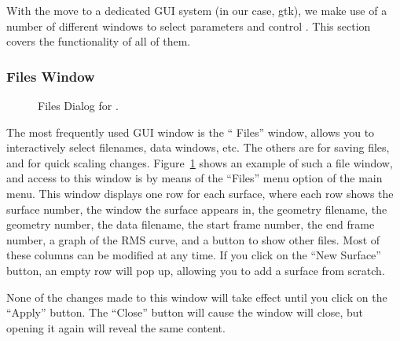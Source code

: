 With the move to a dedicated GUI system (in our case, gtk), we make use of
a number of different windows to select parameters and control \map{}.
This section covers the functionality of all of them.

\subsubsection{Files Window}
\label{sec:fileswindow}

\begin{figure}[htb]
  \begin{makeimage}
  \end{makeimage}
  \filesdialogone
  \caption{\label{fig:file1} Files Dialog for \map{}.}
\end{figure}

The most frequently used GUI window is the ``\map{} Files'' window, allows
you to interactively select filenames, data windows, etc.  The others are
for saving files, and for quick scaling changes.  Figure~\ref{fig:file1}
shows an example of such a file window, and access to this window is by
means of the ``Files'' menu option of the main menu.  This window displays
one row for each surface, where each row shows the surface number, the
window the surface appears in, the geometry filename, the geometry number,
the data filename, the start frame number, the end frame number, a graph of
the RMS curve, and a button to show other files.  Most of these columns can
be modified at any time.  If you click on the ``New Surface'' button, an
empty row will pop up, allowing you to add a surface from scratch.
 
None of the changes made to this window will take effect until you click on
the ``Apply'' button.  The  ``Close'' button will cause  the window
will close, but opening it again will reveal the same content.

